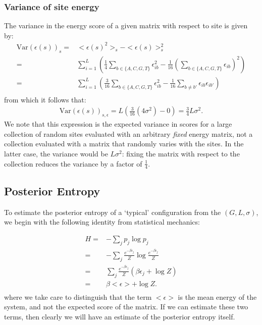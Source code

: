 \documentclass{article}
\newcommand{\ep}{\epsilon}
\newcommand{\Var}{\mathrm{Var}}
\begin{document}
\subsubsection{Variance of site energy}
The variance in the energy score of a given matrix with respect to
site is given by:
\begin{align*}
  \Var(\ep(s))_s =& <\ep(s)^2>_s - <\ep(s)>_s^2\\
  =& \sum_{i=1}^L(\frac{1}{4}\sum_{b\in\{A,C,G,T\}}\ep_{ib}^2 - \frac{1}{16}(\sum_{b\in\{A,C,G,T\}}\ep_{ib})^2)\\
  =& \sum_{i=1}^L(\frac{3}{16}\sum_{b\in\{A,C,G,T\}}\ep_{ib}^2 - \frac{1}{16}\sum_{b\neq b'}\ep_{ib}\ep_{ib'})\\
\end{align*}
from which it follows that:
\begin{align*}
  \Var(\ep(s))_{s,\ep} = L(\frac{3}{16}(4\sigma^2) - 0) = \frac{3}{4}L\sigma^2.
\end{align*}
We note that this expression is the expected variance in scores for a
large collection of random sites evaluated with an arbitrary
\textit{fixed} energy matrix, not a collection evaluated with a matrix
that randomly varies with the sites.  In the latter case, the variance
would be $L\sigma^2$: fixing the matrix with respect to the collection
reduces the variance by a factor of $\frac{1}{4}$.

\subsection{Posterior Entropy}
To estimate the posterior entropy of a `typical' configuration from the $(G,L,\sigma)$, we begin with the following identity from statistical mechanics:

\begin{align}
  H =& -\sum_j p_j\log p_j\nonumber\\
  =& -\sum_j \frac{e^{-\beta\ep_j}}{Z}\log \frac{e^{-\beta\ep_j}}{Z}\nonumber\\
  =& \sum_j \frac{e^{-\beta\ep_j}}{Z}(\beta\ep_j + \log Z)\nonumber\\
  =& \beta<\ep> + \log Z.\nonumber\\
\label{eq:post_ent}
\end{align}
where we take care to distinguish that the term $<\epsilon>$ is the
mean energy of the system, and not the expected score of the matrix.
If we can estimate these two terms, then clearly we will have an
estimate of the posterior entropy itself.
\end{document}
